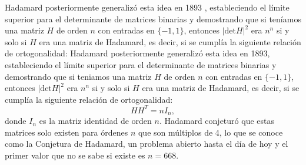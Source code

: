 \documentclass[12pt,a4paper]{tfg_domingo}
\begin{document}
Hadamard posteriormente generalizó esta idea en 1893 \cite{hadamard1893resolution}, estableciendo el límite superior para el determinante de matrices binarias y demostrando que si teníamos una matriz $H$ de orden $n$ con entradas en $\{-1, 1\}$, entonces $|\mathrm{det} H |^{2}$ era $n^{n}$ si y solo si $H$ era una matriz de Hadamard, es decir, si se cumplía la siguiente relación de ortogonalidad:
Hadamard posteriormente generalizó esta idea en 1893, estableciendo el
límite superior para el determinante de matrices binarias y
demostrando que si teniamos una matriz $H$ de orden $n$ con entradas
en $\{-1, 1\}$, entonces $|\mathrm{det} H |^{2}$ era $n^{n}$ si y solo si $H$ era una matriz de Hadamard, es decir, si se cumplía la siguiente relación de ortogonalidad:
\begin{equation}
  \label{eq:hadamard}
  H H^T = n I_n,
\end{equation}
donde $I_n$ es la matriz identidad de orden $n$.
Hadamard conjeturó que estas matrices solo existen para órdenes $n$
que son múltiplos de 4, lo que se conoce como la Conjetura de
Hadamard, un problema abierto hasta el día de hoy y  el primer valor que
no se sabe si existe es $n=668$.
\end{document}
